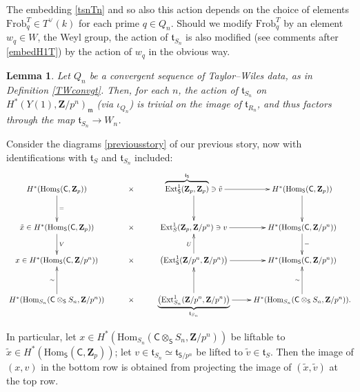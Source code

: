 \documentclass[10pt]{amsart}
\newcommand{\Z}{\mathbf{Z}}
\newcommand{\Ext}{\mathrm{Ext}}
\newcommand{\Hom}{\mathrm{Hom}}
\newcommand{\Frob}{\mathrm{Frob}}
\newcommand{\Cinf}{\mathsf{C}}
\newcommand{\Sinf}{\mathsf{S}}
\newtheorem{lemma}[subsection]{Lemma}
\theoremstyle{remark}
\begin{document}
%
%
%
 

The embedding \eqref{tsnTn} and so also this action depends on the choice of elements $\Frob_q^T \in T^{\vee}(k)$ for each prime $q \in Q_n$. 
Should we modify $\Frob_q^T$ by an element $w_q \in W$, the Weyl group, the action of $\mathfrak{t}_{S_n}$
is also modified (see  comments after \eqref{embedH1T})  by the action of $w_q$  in the obvious way.  
 
 \begin{lemma} 
   \label{Vnfactor}
   Let $Q_n$ be a convergent sequence of Taylor--Wiles data, as in Definition \ref{TWconvgt}.    
   Then, for each $n$, 
the action of $\mathfrak{t}_{S_n}$ on $H^*(Y(1), \Z/p^n)_{\mathfrak{m}}$  (via $\iota_{Q_n}$)  is trivial on the image of $\mathfrak{t}_{R_n}$, and thus  factors through the map $\mathfrak{t}_{S_n} \rightarrow  W_n$. 
  \end{lemma}
  
  \proof 
 Consider the diagrams \eqref{previousstory} of our previous story, now with identifications with $\mathfrak{t}_S$ and $\mathfrak{t}_{S_n}$ included: 
 \begin{equation} \label{BigDog}
 \xymatrix{
 H^*(\Hom_{\Sinf}(\Cinf, \Z_p))^{} \ar[d]^{=} & \times  &   \protect\overbrace{ \Ext^1_{\Sinf}(\Z_p, \Z_p) }^{\mathfrak{t}_{\Sinf}}\owns \tilde{v} \ar[d]  \ar[r] &  H^*(\Hom_{\Sinf}(\Cinf, \Z_p)) \ar[d] \\ 
   \tilde{x} \in H^*(\Hom_{\Sinf}(\Cinf, \Z_p))   \ar[d]^{V}  &  \times&  \Ext^1_S(\Z_p, \Z/p^n)     \owns  v \ar[r]  &   H^*(\Hom_{\Sinf}(\Cinf,  \Z/p^n))\ar[d]^{=}  \\
x \in  H^*(\Hom_{\Sinf}(\Cinf, \Z/p^n))^{}   & \times & \left( \Ext^1_{\Sinf}(\Z/p^n, \Z/p^n) \right) \ar[r]   \ar[u]^U  &  H^*(\Hom_{\Sinf}(\Cinf, \Z/p^n))   \\
 H^*(\Hom_{S_n}(\Cinf \otimes_{\Sinf} S_n, \Z/p^n))^{} \ar[u]^{\sim} & \times  &  \protect\underbrace{ \left( \Ext^1_{S_n}(\Z/p^n, \Z/p^n) \right) }_{\mathfrak{t}_{S_n}} \ar[r] \ar[u] &  \ar[u]^{\sim} H^*(\Hom_{S_n}(\Cinf \otimes_{\Sinf} S_n, \Z/p^n)). \\
  }
  \end{equation}
  

  
     
   In particular,   let $x \in  H^*(\Hom_{S_n}(\Cinf \otimes_{\Sinf} S_n, \Z/p^n)) $ be liftable to $\tilde{x} \in  H^*(\Hom_{\Sinf}(\Cinf, \Z_p))$;
   let $v \in \mathfrak{t}_{S_n} \simeq \mathfrak{t}_{\Sinf/p^n}$ be lifted to $\tilde{v} \in \mathfrak{t}_S$. Then the image of $(x,v)$
   in the bottom row is obtained from projecting the image of $(\tilde{x}, \tilde{v})$ at the top row. 
   
\end{document}
